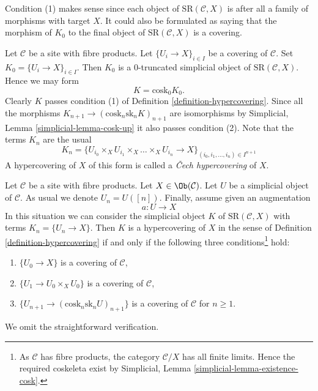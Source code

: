 \noindent
Condition (1) makes sense since each object of
$\text{SR}(\mathcal{C}, X)$ is after all a family
of morphisms with target $X$. It could also be
formulated as saying that the morphism of $K_0$ to
the final object of $\text{SR}(\mathcal{C}, X)$
is a covering.

\begin{example}
\label{example-cech}
Let $\mathcal{C}$ be a site with fibre products.
Let $\{U_i \to X\}_{i \in I}$ be a covering of $\mathcal{C}$.
Set $K_0 = \{U_i \to X\}_{i \in I}$.
Then $K_0$ is a $0$-truncated simplicial object of
$\text{SR}(\mathcal{C}, X)$. Hence we may form
$$
K = \text{cosk}_0 K_0.
$$
Clearly $K$ passes condition (1) of Definition \ref{definition-hypercovering}.
Since all the morphisms $K_{n + 1} \to (\text{cosk}_n \text{sk}_n K)_{n + 1}$
are isomorphisms by
Simplicial, Lemma \ref{simplicial-lemma-cosk-up}
it also passes condition (2). Note that
the terms $K_n$ are the usual
$$
K_n = \{
U_{i_0} \times_X U_{i_1} \times_X \ldots \times_X U_{i_n} \to X
\}_{(i_0, i_1, \ldots, i_n) \in I^{n + 1}}
$$
A hypercovering of $X$ of this form is called a
{\it {\v C}ech hypercovering} of $X$.
\end{example}

\begin{example}
\label{example-hypercovering-in-C}
Let $\mathcal{C}$ be a site with fibre products. Let
$X \in \Ob(\mathcal{C})$. Let $U$ be a simplicial object of $\mathcal{C}$.
As usual we denote $U_n = U([n])$. Finally, assume given an augmentation
$$
a : U \to X
$$
In this situation we can consider the simplicial object $K$
of $\text{SR}(\mathcal{C}, X)$ with terms $K_n = \{U_n \to X\}$.
Then $K$ is a hypercovering of $X$ in the sense of
Definition \ref{definition-hypercovering}
if and only if the following three
conditions\footnote{As $\mathcal{C}$ has fibre products, the
category $\mathcal{C}/X$ has all finite limits.
Hence the required coskeleta exist by
Simplicial, Lemma \ref{simplicial-lemma-existence-cosk}.} hold:
\begin{enumerate}
\item $\{U_0 \to X\}$ is a covering of $\mathcal{C}$,
\item $\{U_1 \to U_0 \times_X U_0\}$ is a covering of $\mathcal{C}$,
\item $\{U_{n + 1} \to (\text{cosk}_n\text{sk}_n U)_{n + 1}\}$
is a covering of $\mathcal{C}$ for $n \geq 1$.
\end{enumerate}
We omit the straightforward verification.
\end{example}

